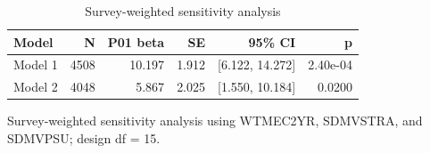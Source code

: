 \begin{table}[!htbp]
\centering
\small
\caption{Survey-weighted sensitivity analysis}
\label{tab:tableS1_survey_weighted}
\begin{tabular}{lrrrrr}
\hline
Model & N & P01 beta & SE & 95\% CI & p \\
\hline
Model 1 & 4508 & 10.197 & 1.912 & [6.122, 14.272] & 2.40e-04 \\
Model 2 & 4048 & 5.867 & 2.025 & [1.550, 10.184] & 0.0200 \\
\hline
\end{tabular}
\vspace{2pt}
\begin{minipage}{\linewidth}\footnotesize
Survey-weighted sensitivity analysis using WTMEC2YR, SDMVSTRA, and SDMVPSU; design df = 15.
\end{minipage}
\end{table}
